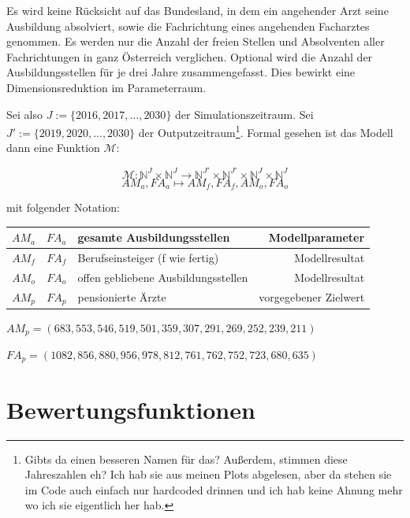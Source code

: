 \documentclass[a4paper,12pt]{article}
\begin{document}
Es wird keine Rücksicht auf das Bundesland, in dem ein angehender Arzt seine Ausbildung absolviert, sowie die Fachrichtung eines angehenden Facharztes genommen. Es werden nur die Anzahl der freien Stellen und Absolventen aller Fachrichtungen in ganz Österreich verglichen. Optional wird die Anzahl der Ausbildungsstellen für je drei Jahre zusammengefasst. Dies bewirkt eine Dimensionsreduktion im Parameterraum.

Sei also $J := \{2016,2017,\hdots,2030\}$ der Simulationszeitraum. Sei $J' := \{2019,2020,\hdots,2030\}$ der Outputzeitraum\footnote{Gibts da einen besseren Namen für das? Außerdem, stimmen diese Jahreszahlen eh? Ich hab sie aus meinen Plots abgelesen, aber da stehen sie im Code auch einfach nur hardcoded drinnen und ich hab keine Ahnung mehr wo ich sie eigentlich her hab.}. Formal gesehen ist das Modell dann eine Funktion $\mathcal M$:

\begin{equation*}
\mathcal M: \mathbb{N}^J \times \mathbb{N}^J \rightarrow \mathbb{N}^{J'} \times \mathbb{N}^{J'} \times \mathbb{N}^{J} \times \mathbb{N}^{J}
\end{equation*}
\begin{equation*}
AM_a, FA_a \mapsto AM_f, FA_f, AM_o, FA_o
\end{equation*}

mit folgender Notation:

\begin{center}
\begin{tabular}{ | c | c | l | r |}
\hline
$AM_a$ & $FA_a$ & gesamte Ausbildungsstellen & Modellparameter \\ \hline
$AM_f$ & $FA_f$ & Berufseinsteiger (f wie fertig) & Modellresultat \\ \hline
$AM_o$ & $FA_o$ & offen gebliebene Ausbildungsstellen & Modellresultat \\ \hline
$AM_p$ & $FA_p$ & pensionierte Ärzte & vorgegebener Zielwert \\ \hline
\end{tabular}
\end{center}

$AM_p = (683, 553, 546, 519, 501, 359, 307, 291, 269, 252, 239, 211)$

$FA_p = (1082, 856, 880, 956, 978, 812, 761, 762, 752, 723, 680, 635)$

\section{Bewertungsfunktionen}
\end{document}
